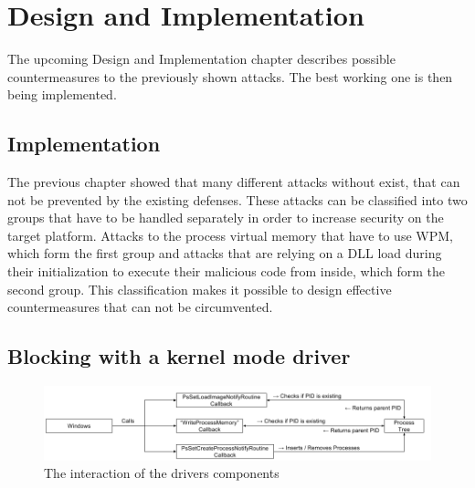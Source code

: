 \section{Design and Implementation}
The upcoming Design and Implementation chapter describes possible countermeasures to the previously shown attacks. The best working one is then being implemented.

\subsection{Implementation}
\label{sec:implementation}
The previous chapter showed that many different attacks without exist, that can not be prevented by the existing defenses. These attacks can be classified into two groups that have to be handled separately in order to increase security on the target platform. Attacks to the process virtual memory that have to use \gls{WPM}, which form the first group and attacks that are relying on a \gls{DLL} load during their initialization to execute their malicious code from inside, which form the second group. This classification makes it possible to design effective countermeasures that can not be circumvented. 

\subsection{Blocking  with a kernel mode driver}
\begin{figure}[!htbp]
\centering
\includegraphics[angle=90,scale=0.6]{sections/implementation/interaction.png}
\caption{The interaction of the drivers components}
\label{fig:interaction}
\end{figure}

